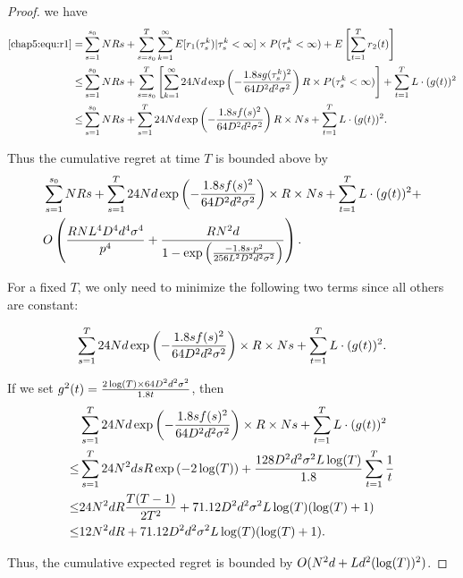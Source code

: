 \begin{proof}
we have
\begin{align}
\eqref{chap5:equ:r1}= & \sum_{s=1}^{s_0}N R s + \sum_{s=s_0}^{T}\sum_{k=1}^{\infty}E[r_1(\tau_{s}^{k})|\tau_{s}^{k}<\infty]\times P(\tau_{s}^{k}<\infty) + E\left[\sum_{t=1}^{T}r_2(t)\right] \nonumber \\
\leq & \sum_{s=1}^{s_0}N R s + \sum_{s=s_0}^{T}\left[\sum_{k=1}^{\infty}24N d\exp\left(-\frac{1.8s g(\tau_{s}^{k})^2}{64 D^2 d^2\sigma^2}\right) R\times P(\tau_{s}^{k}<\infty) \right]+ \sum_{t=1}^{T}L\cdot (g(t))^2 \nonumber \\
\leq & \sum_{s=1}^{s_0}N R s + \sum_{s=1}^{T} 24 N  d\exp\left(-\frac{1.8s f(s)^2}{64 D^2 d^2\sigma^2}\right) R \times N s+ \sum_{t=1}^{T}L\cdot (g(t))^2. \label{chap5:equ:regret}
\end{align}

Thus the cumulative regret at time $T$ is bounded above by
\begin{align}
&\sum_{s=1}^{s_0}N R s + \sum_{s=1}^{T} 24N d\exp\left(-\frac{1.8s f(s)^2}{64 D^2 d^2\sigma^2}\right)\times R \times N s+ \sum_{t=1}^{T}L \cdot (g(t))^2  +\nonumber \\
&O \left( \frac{R N L^4 D^4 d^4 \sigma^4}{p^4}
  + \frac{R N^2 d}{1 - \exp \left(
    \frac{-1.8 s \cdot p^2}{256 L^2 D^2 d^2 \sigma^2}
  \right)} \right). \nonumber 
\end{align}

For a fixed $T$, we only need to minimize the following two terms since all others are constant:

\begin{align}
\sum_{s=1}^{T} 24N d\exp\left(-\frac{1.8s f(s)^2}{64 D^2 d^2\sigma^2}\right)\times R \times N s+ \sum_{t=1}^{T}L \cdot (g(t))^2. \label{equ:regret}
\end{align}

If we set $g^2(t)=\frac{2\log(T)\times 64D^2 d^2\sigma^2}{1.8t}$, then
\begin{align}
&\sum_{s=1}^{T} 24N d\exp\left(-\frac{1.8s f(s)^2}{64 D^2 d^2\sigma^2}\right)\times R \times N s+ \sum_{t=1}^{T}L\cdot (g(t))^2 \nonumber \\ 
\leq & \sum_{s=1}^{T} 24N^2 d s R \exp\left(-2\log(T)\right)  + \frac{128D^2 d^2\sigma^2 L\log(T)}{1.8}\sum_{t=1}^{T}\frac{1}{t} \nonumber \\
\leq &  24N^2 d R\frac{T(T-1)}{2T^2}  + 71.12 D^2 d^2\sigma^2 L\log(T)(\log(T)+1) \nonumber \\
\leq &  12 N^2 d R  + 71.12 D^2 d^2\sigma^2 L\log(T)(\log(T)+1). \nonumber
\end{align}

Thus, the cumulative expected regret is bounded by $O(N^2 d + L d^2(\log(T))^2)$.
\end{proof}

